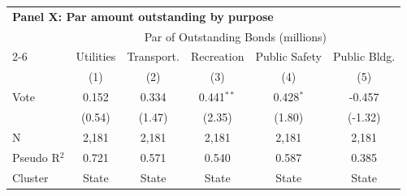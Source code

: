 \begingroup
\centering
\begin{tabular*}{\textwidth}{@{\extracolsep{\fill}}lccccc}
\multicolumn{6}{l}{\textbf{Panel X: Par amount outstanding by purpose}}\\

\addlinespace
   \toprule
    & \multicolumn{5}{c}{Par of Outstanding Bonds (millions)}\\
   \cmidrule(lr){2-6}
                & Utilities & Transport. & Recreation   & Public Safety & Public Bldg. \\   
                & (1)       & (2)        & (3)          & (4)           & (5)\\  
   \midrule 
   Vote         & 0.152     & 0.334      & 0.441$^{**}$ & 0.428$^{*}$   & -0.457\\   
                & (0.54)   & (1.47)    & (2.35)      & (1.80)       & (-1.32)\\   
   \hline
   N & 2,181     & 2,181      & 2,181        & 2,181         & 2,181\\  
   Pseudo R$^2$ & 0.721     & 0.571      & 0.540        & 0.587         & 0.385\\  
   Cluster              & State & State & State & State & State\\  
   \bottomrule
\end{tabular*}
\par\endgroup
